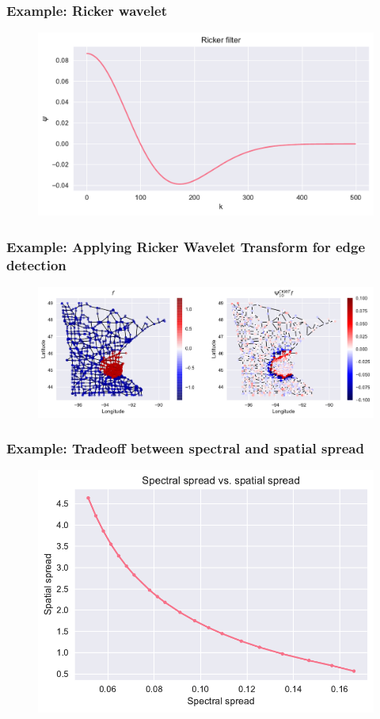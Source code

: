 \documentclass{beamer}
\begin{document}
\begin{frame}
  \frametitle{Example: Ricker wavelet}
\begin{figure}
\includegraphics[width=0.9\linewidth]{../img/wavelet_filter_0.pdf}
\end{figure}
\end{frame}

\begin{frame}
  \frametitle{Example: Applying Ricker Wavelet Transform for edge detection}
\begin{figure}
\includegraphics[width=0.9\linewidth]{../img/wavelet_filter_1.pdf}
\end{figure}
\end{frame}

\begin{frame}
  \frametitle{Example: Tradeoff between spectral and spatial spread}
\begin{figure}
\includegraphics[width=0.9\linewidth]{../img/wavelet_filter_7.pdf}
\end{figure}
\end{frame}
 
\end{document}
